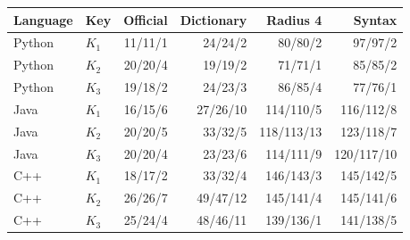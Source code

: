 \begin{tabular}{@{}llrrrr@{}}
\toprule
Language & Key & Official & Dictionary & Radius 4 & Syntax \\
\midrule
Python & $K_1$ & 11/11/1 & 24/24/2 & 80/80/2 & 97/97/2 \\
Python & $K_2$ & 20/20/4 & 19/19/2 & 71/71/1 & 85/85/2 \\
Python & $K_3$ & 19/18/2 & 24/23/3 & 86/85/4 & 77/76/1 \\
Java & $K_1$ & 16/15/6 & 27/26/10 & 114/110/5 & 116/112/8 \\
Java & $K_2$ & 20/20/5 & 33/32/5 & 118/113/13 & 123/118/7 \\
Java & $K_3$ & 20/20/4 & 23/23/6 & 114/111/9 & 120/117/10 \\
C++ & $K_1$ & 18/17/2 & 33/32/4 & 146/143/3 & 145/142/5 \\
C++ & $K_2$ & 26/26/7 & 49/47/12 & 145/141/4 & 145/141/6 \\
C++ & $K_3$ & 25/24/4 & 48/46/11 & 139/136/1 & 141/138/5 \\
\bottomrule
\end{tabular}
